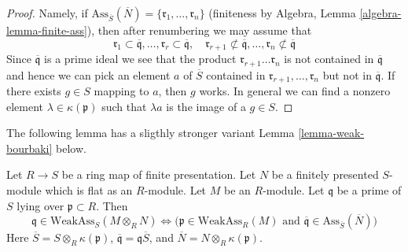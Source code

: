 \begin{proof}
Namely, if $\text{Ass}_{\overline{S}}(\overline{N}) =
\{\mathfrak r_1, \ldots, \mathfrak r_n\}$
(finiteness by Algebra, Lemma \ref{algebra-lemma-finite-ass}),
then after renumbering we may assume that
$$
\mathfrak r_1 \subset \overline{\mathfrak q},
\ldots,
\mathfrak r_r \subset \overline{\mathfrak q}, \quad
\mathfrak r_{r + 1} \not \subset \overline{\mathfrak q},
\ldots,
\mathfrak r_n \not \subset \overline{\mathfrak q}
$$
Since $\overline{\mathfrak q}$ is a prime ideal we see that the product
$\mathfrak r_{r + 1} \ldots \mathfrak r_n$ is not contained in
$\overline{\mathfrak q}$ and hence we can pick an element
$a$ of $\overline{S}$ contained in
$\mathfrak r_{r + 1}, \ldots, \mathfrak r_n$ but not in
$\overline{\mathfrak q}$.
If there exists $g \in S$ mapping to $a$, then $g$
works. In general we can find a nonzero element
$\lambda \in \kappa(\mathfrak p)$
such that $\lambda a$ is the image of a $g \in S$.
\end{proof}

\noindent
The following lemma has a sligthly stronger variant
Lemma \ref{lemma-weak-bourbaki}
below.

\begin{lemma}
\label{lemma-weak-bourbaki-pre}
Let $R \to S$ be a ring map of finite presentation.
Let $N$ be a finitely presented $S$-module
which is flat as an $R$-module. Let $M$ be an $R$-module.
Let $\mathfrak q$ be a prime of $S$ lying over $\mathfrak p \subset R$.
Then
$$
\mathfrak q \in \text{WeakAss}_S(M \otimes_R N)
\Leftrightarrow
\Big(
\mathfrak p \in \text{WeakAss}_R(M)
\text{ and }
\overline{\mathfrak q} \in \text{Ass}_{\overline{S}}(\overline{N})
\Big)
$$
Here $\overline{S} = S \otimes_R \kappa(\mathfrak p)$,
$\overline{\mathfrak q} = \mathfrak q \overline{S}$, and
$\overline{N} = N \otimes_R \kappa(\mathfrak p)$.
\end{lemma}

